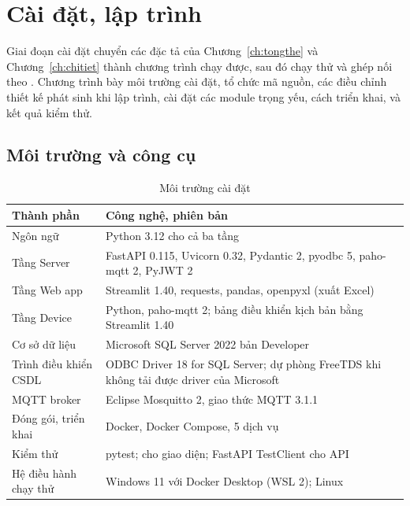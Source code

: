 \chapter{Cài đặt, lập trình}
\label{ch:caidat}

Giai đoạn cài đặt chuyển các đặc tả của Chương~\ref{ch:tongthe} và Chương~\ref{ch:chitiet} thành chương trình chạy được, sau đó chạy thử và ghép nối theo \cite[Ch.~11]{tung_qlhttt}. Chương trình bày môi trường cài đặt, tổ chức mã nguồn, các điều chỉnh thiết kế phát sinh khi lập trình, cài đặt các module trọng yếu, cách triển khai, và kết quả kiểm thử.

\section{Môi trường và công cụ}
\label{sec:moitruong}

\begin{table}[H]
\centering
\caption{Môi trường cài đặt}
\label{tab:moitruong}
\small
\begin{tabularx}{\textwidth}{L{3.6cm} Y}
\toprule
\textbf{Thành phần} & \textbf{Công nghệ, phiên bản} \\
\midrule
Ngôn ngữ & Python 3.12 cho cả ba tầng \\
Tầng Server & FastAPI 0.115, Uvicorn 0.32, Pydantic 2, pyodbc 5, paho-mqtt 2, PyJWT 2 \\
Tầng Web app & Streamlit 1.40, requests, pandas, openpyxl (xuất Excel) \\
Tầng Device & Python, paho-mqtt 2; bảng điều khiển kịch bản bằng Streamlit 1.40 \\
Cơ sở dữ liệu & Microsoft SQL Server 2022 bản Developer \\
Trình điều khiển CSDL & ODBC Driver 18 for SQL Server; dự phòng FreeTDS khi không tải được driver của Microsoft \\
MQTT broker & Eclipse Mosquitto 2, giao thức MQTT 3.1.1 \\
Đóng gói, triển khai & Docker, Docker Compose, 5 dịch vụ \\
Kiểm thử & pytest;  cho giao diện; FastAPI TestClient cho API \\
Hệ điều hành chạy thử & Windows 11 với Docker Desktop (WSL 2); Linux \\
\bottomrule
\end{tabularx}
\end{table}


